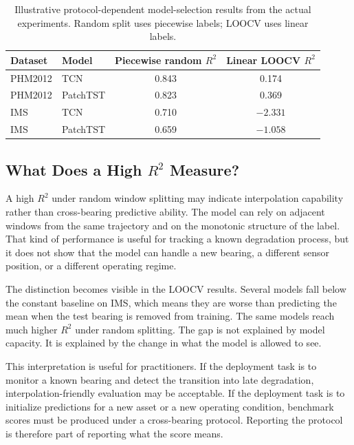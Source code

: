 \documentclass[pdflatex,sn-mathphys-num]{sn-jnl}
\begin{document}
\begin{table}[t]
\centering
\caption{Illustrative protocol-dependent model-selection results from the actual experiments. Random split uses piecewise labels; LOOCV uses linear labels.}
\label{tab:deployment_selection}
\small
\begin{tabular}{llcc}
\toprule
Dataset & Model & Piecewise random $R^2$ & Linear LOOCV $R^2$ \\
\midrule
PHM2012 & TCN & 0.843 & 0.174 \\
PHM2012 & PatchTST & 0.823 & 0.369 \\
IMS & TCN & 0.710 & $-2.331$ \\
IMS & PatchTST & 0.659 & $-1.058$ \\
\bottomrule
\end{tabular}
\end{table}

\subsection{What Does a High $R^2$ Measure?}
A high $R^2$ under random window splitting may indicate interpolation capability rather than cross-bearing predictive ability. The model can rely on adjacent windows from the same trajectory and on the monotonic structure of the label. That kind of performance is useful for tracking a known degradation process, but it does not show that the model can handle a new bearing, a different sensor position, or a different operating regime.

The distinction becomes visible in the LOOCV results. Several models fall below the constant baseline on IMS, which means they are worse than predicting the mean when the test bearing is removed from training. The same models reach much higher $R^2$ under random splitting. The gap is not explained by model capacity. It is explained by the change in what the model is allowed to see.

This interpretation is useful for practitioners. If the deployment task is to monitor a known bearing and detect the transition into late degradation, interpolation-friendly evaluation may be acceptable. If the deployment task is to initialize predictions for a new asset or a new operating condition, benchmark scores must be produced under a cross-bearing protocol. Reporting the protocol is therefore part of reporting what the score means.
\end{document}

